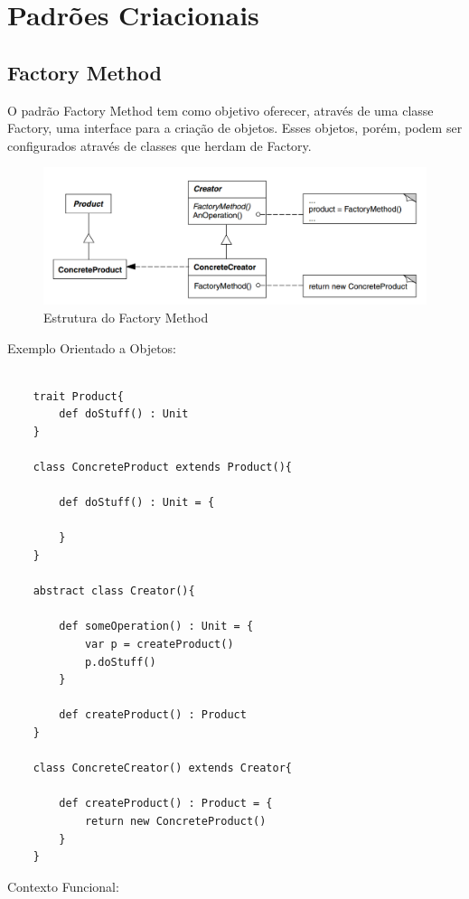 \chapter{Padrões Criacionais}

\section{Factory Method}

O padrão Factory Method tem como objetivo oferecer, através de uma 
classe Factory, uma interface para a criação de objetos. Esses objetos, 
porém, podem ser configurados através de classes que herdam de Factory.


\begin{figure}[htb]
	\caption{\label{fmethod_struct}Estrutura do Factory Method}
	\begin{center}
	    \includegraphics[scale=0.4]{5_padroes-contexto-funcional/5.1_criacionais/5.1.1_factory-method/diagram.png}
	\end{center}
\end{figure}

Exemplo Orientado a Objetos:

\begin{lstlisting}[caption={Factory Method Orientado a Objetos},label=oofactory]
    
    trait Product{
        def doStuff() : Unit
    }

    class ConcreteProduct extends Product(){

        def doStuff() : Unit = {
            
        }
    }

    abstract class Creator(){

        def someOperation() : Unit = {
            var p = createProduct()
            p.doStuff()
        }

        def createProduct() : Product
    }

    class ConcreteCreator() extends Creator{

        def createProduct() : Product = {
            return new ConcreteProduct()
        }
    }

\end{lstlisting}

Contexto Funcional:

\begin{lstlisting}[caption={Factory Method Funcional},label=fpfactory]
    
    

\end{lstlisting}
